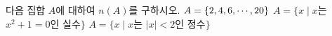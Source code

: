 다음 집합 $A$에 대하여 $n(A)$를 구하시오.
 $A=\{2{,}\mkern3mu\mathopen{}4{,}\mkern3mu\mathopen{}6{,}\mkern3mu\mathopen{}\cdots{,}\mkern3mu\mathopen{}20\}$
 $A=\{x \mid x$는 $x^2+1=0$인 실수$\}$
 $A=\{x \mid x$는 $|x|<2$인 정수$\}$
